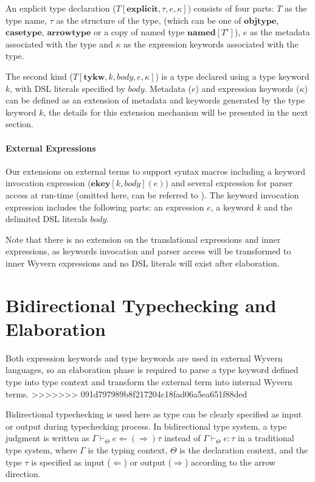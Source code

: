 \documentclass{sig-alternate}
\begin{document}
An explicit type declaration ($T[\mathbf{explicit}, \tau,e,\kappa]$) consists of four parts: $T$ as the type name, $\tau$ as the structure of the type, (which can be one of $\mathbf{objtype}$, $\mathbf{casetype}$, $\mathbf{arrowtype}$ or a copy of named type $\mathbf{named}[T']$),  $e$ as the metadata associated with the type and $\kappa$ as the expression keywords associated with the type. 

The second kind ($T[\mathbf{tykw},k,body,e,\kappa]$) is a type declared using a type keyword $k$, with DSL literals specified by $body$. Metadata ($e$) and expression keywords ($\kappa$) can be defined as an extension of metadata and keywords generated by the type keyword $k$, the details for this extension mechanism will be presented in the next section.

\paragraph{External Expressions}
Our extensions on external terms to support syntax macros including a keyword invocation expression ($\mathbf{ekey}[k,body](e)$) and several expression for parser access at run-time (omitted here, can be referred to ). The keyword invocation expression includes the following parts: an expression $e$, a keyword $k$ and the delimited DSL literals $body$.

Note that there is no extension on the translational expressions and inner expressions, as keywords invocation and parser access will be transformed to inner Wyvern expressions and no DSL literals will exist after elaboration.

\section{Bidirectional Typechecking and Elaboration}
Both expression keywords and type keywords are used in external Wyvern languages, so an elaboration phase is required to parse a type keyword defined type into type context and transform the external term into internal Wyvern terms. 
>>>>>>> 091d797989b8f217204c18fad06a5ea651f88ded

Bidirectional typechecking is used here as type can be clearly specified as input or output during typechecking process. In bidirectional type system, a type judgment is written as $\Gamma\vdash_{\Theta} e\Leftarrow(\Rightarrow)\tau$ instead of $\Gamma\vdash_{\Theta} e:\tau$ in a traditional type system, where $\Gamma$ is the typing context, $\Theta$ is the declaration context, and the type $\tau$ is specified as input ($\Leftarrow$) or output ($\Rightarrow$) according to the arrow direction. 
\end{document}
